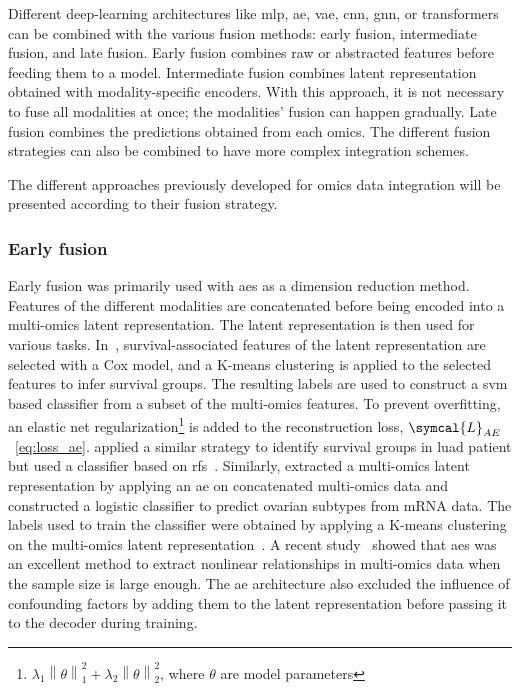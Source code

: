 \documentclass[../main.tex]{subfiles}
\begin{document}
		Different deep-learning architectures like \gls{mlp}, \gls{ae}, \gls{vae}, \gls{cnn}, \gls{gnn}, or transformers can be combined with the various fusion methods: early fusion, intermediate fusion, and late fusion. 
		Early fusion combines raw or abstracted features before feeding them to a model. 
		Intermediate fusion combines latent representation obtained with modality-specific encoders. 
		With this approach, it is not necessary to fuse all modalities at once; the modalities' fusion can happen gradually. 
		Late fusion combines the predictions obtained from each omics. 
		The different fusion strategies can also be combined to have more complex integration schemes. 
		
		The different approaches previously developed for omics data integration will be presented according to their fusion strategy. 
		\subsubsection{Early fusion}
		Early fusion was primarily used with \glspl{ae} as a dimension reduction method. 
		Features of the different modalities are concatenated before being encoded into a multi-omics latent representation. 
		The latent representation is then used for various tasks. 
		In~\cite{Chaudhary2018}, survival-associated features of the latent representation are selected with a Cox model, and a K-means clustering is applied to the selected features to infer survival groups. 
		The resulting labels are used to construct a \gls{svm} based classifier from a subset of the multi-omics features. 
		To prevent overfitting, an elastic net regularization\footnote{\(\lambda_{1} \left\|\theta\right\|_{1}^{2} + \lambda_{2} \left\|\theta\right\|_{2}^{2}\), where \(\theta\) are model parameters} is added to the reconstruction loss, \(\symcal{L}_{AE}\)~\cref{eq:loss_ae}. 
				\citeauthor{Lee2020} applied a similar strategy to identify survival groups in \gls{luad} patient but used a classifier based on \glspl{rf}~\cite{Lee2020}.  
		Similarly, \citeauthor{Guo2020} extracted a multi-omics latent representation by applying an \gls{ae} on concatenated multi-omics data and constructed a logistic classifier to predict ovarian subtypes from mRNA data. 
		The labels used to train the classifier were obtained by applying a K-means clustering on the multi-omics latent representation~\cite{Guo2020}. 
		A recent study~\cite{Yu2022} showed that \glspl{ae} was an excellent method to extract nonlinear relationships in multi-omics data when the sample size is large enough. 
		The \gls{ae} architecture also excluded the influence of confounding factors by adding them to the latent representation before passing it to the decoder during training. 
				
\end{document}
